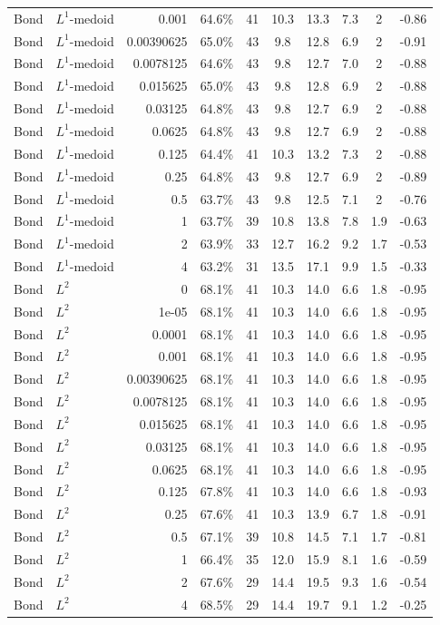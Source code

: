 \begin{landscape}
\begin{longtable}{llrccccccc}
Bond & $L^1$-medoid & 0.001 & 64.6\% & 41 & 10.3 & 13.3 & 7.3 & 2 & -0.86 \\
Bond & $L^1$-medoid & 0.00390625 & 65.0\% & 43 & 9.8 & 12.8 & 6.9 & 2 & -0.91 \\
Bond & $L^1$-medoid & 0.0078125 & 64.6\% & 43 & 9.8 & 12.7 & 7.0 & 2 & -0.88 \\
Bond & $L^1$-medoid & 0.015625 & 65.0\% & 43 & 9.8 & 12.8 & 6.9 & 2 & -0.88 \\
Bond & $L^1$-medoid & 0.03125 & 64.8\% & 43 & 9.8 & 12.7 & 6.9 & 2 & -0.88 \\
Bond & $L^1$-medoid & 0.0625 & 64.8\% & 43 & 9.8 & 12.7 & 6.9 & 2 & -0.88 \\
Bond & $L^1$-medoid & 0.125 & 64.4\% & 41 & 10.3 & 13.2 & 7.3 & 2 & -0.88 \\
Bond & $L^1$-medoid & 0.25 & 64.8\% & 43 & 9.8 & 12.7 & 6.9 & 2 & -0.89 \\
Bond & $L^1$-medoid & 0.5 & 63.7\% & 43 & 9.8 & 12.5 & 7.1 & 2 & -0.76 \\
Bond & $L^1$-medoid & 1 & 63.7\% & 39 & 10.8 & 13.8 & 7.8 & 1.9 & -0.63 \\
Bond & $L^1$-medoid & 2 & 63.9\% & 33 & 12.7 & 16.2 & 9.2 & 1.7 & -0.53 \\
Bond & $L^1$-medoid & 4 & 63.2\% & 31 & 13.5 & 17.1 & 9.9 & 1.5 & -0.33 \\
Bond & $L^2$ & 0 & 68.1\% & 41 & 10.3 & 14.0 & 6.6 & 1.8 & -0.95 \\
Bond & $L^2$ & 1e-05 & 68.1\% & 41 & 10.3 & 14.0 & 6.6 & 1.8 & -0.95 \\
Bond & $L^2$ & 0.0001 & 68.1\% & 41 & 10.3 & 14.0 & 6.6 & 1.8 & -0.95 \\
Bond & $L^2$ & 0.001 & 68.1\% & 41 & 10.3 & 14.0 & 6.6 & 1.8 & -0.95 \\
Bond & $L^2$ & 0.00390625 & 68.1\% & 41 & 10.3 & 14.0 & 6.6 & 1.8 & -0.95 \\
Bond & $L^2$ & 0.0078125 & 68.1\% & 41 & 10.3 & 14.0 & 6.6 & 1.8 & -0.95 \\
Bond & $L^2$ & 0.015625 & 68.1\% & 41 & 10.3 & 14.0 & 6.6 & 1.8 & -0.95 \\
Bond & $L^2$ & 0.03125 & 68.1\% & 41 & 10.3 & 14.0 & 6.6 & 1.8 & -0.95 \\
Bond & $L^2$ & 0.0625 & 68.1\% & 41 & 10.3 & 14.0 & 6.6 & 1.8 & -0.95 \\
Bond & $L^2$ & 0.125 & 67.8\% & 41 & 10.3 & 14.0 & 6.6 & 1.8 & -0.93 \\
Bond & $L^2$ & 0.25 & 67.6\% & 41 & 10.3 & 13.9 & 6.7 & 1.8 & -0.91 \\
Bond & $L^2$ & 0.5 & 67.1\% & 39 & 10.8 & 14.5 & 7.1 & 1.7 & -0.81 \\
Bond & $L^2$ & 1 & 66.4\% & 35 & 12.0 & 15.9 & 8.1 & 1.6 & -0.59 \\
Bond & $L^2$ & 2 & 67.6\% & 29 & 14.4 & 19.5 & 9.3 & 1.6 & -0.54 \\
Bond & $L^2$ & 4 & 68.5\% & 29 & 14.4 & 19.7 & 9.1 & 1.2 & -0.25 \\
\bottomrule
\end{longtable}
\endgroup
\end{landscape}


